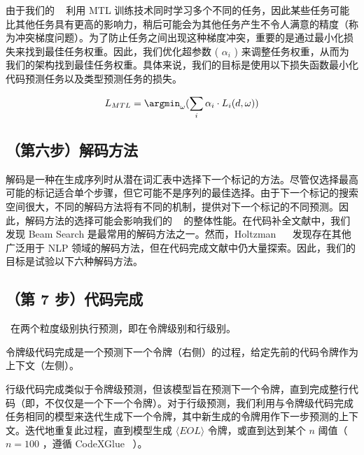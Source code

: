 \documentclass[UTF8]{article}
\begin{document}
由于我们的    \our    ~ 利用 MTL 训练技术同时学习多个不同的任务，因此某些任务可能比其他任务具有更高的影响力，稍后可能会为其他任务产生不令人满意的精度（称为冲突梯度问题）。为了防止任务之间出现这种梯度冲突，重要的是通过最小化损失来找到最佳任务权重。因此，我们优化超参数 (    $\alpha_i$    ) 来调整任务权重，从而为我们的架构找到最佳任务权重。具体来说，我们的目标是使用以下损失函数最小化代码预测任务以及类型预测任务的损失。

   \begin{equation}
    \label{eq:rq3}
    L_{MTL} = \argmin_{\omega}(\sum_{i}\alpha_i \cdot L_{i}(d, \omega))
\end{equation}   

   \subsection{（第六步）解码方法}   
    \label{sec:approach-decoding}   

解码是一种在生成序列时从潜在词汇表中选择下一个标记的方法。尽管仅选择最高可能的标记适合单个步骤，但它可能不是序列的最佳选择。由于下一个标记的搜索空间很大，不同的解码方法将有不同的机制，提供对下一个标记的不同预测。因此，解码方法的选择可能会影响我们的 ~    \our    的整体性能。在代码补全文献中，我们发现 Beam Search 是最常用的解码方法之一。然而，Holtzman~    \ea    ~    \cite{holtzman2019curious}    发现存在其他广泛用于 NLP 领域的解码方法，但在代码完成文献中仍大量探索。因此，我们的目标是试验以下六种解码方法。

      

   \subsection{（第 7 步）代码完成}   
    \our    ~在两个粒度级别执行预测，即在令牌级别和行级别。

令牌级代码完成是一个预测下一个令牌（右侧）的过程，给定先前的代码令牌作为上下文（左侧）。

行级代码完成类似于令牌级预测，但该模型旨在预测下一个令牌，直到完成整行代码（即，不仅仅是一个下一个令牌）。对于行级预测，我们利用与令牌级代码完成任务相同的模型来迭代生成下一个令牌，其中新生成的令牌用作下一步预测的上下文。迭代地重复此过程，直到模型生成    $\langle EOL \rangle$    令牌，或直到达到某个    $n$    阈值（   $n=100$   ，遵循 CodeXGlue~   \cite{lu2021codexglue}   ）。
\end{document}
